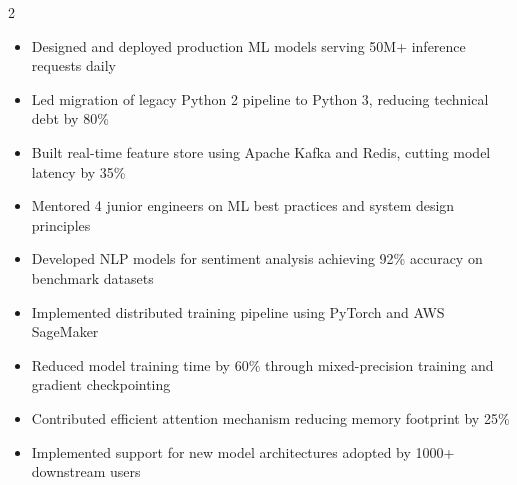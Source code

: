 \documentclass[10pt,a4paper,ragged2e,withhyper]{altacv}
\begin{document}

\makecvheader


\begin{paracol}{2}


\begin{itemize}
  \item Designed and deployed production ML models serving 50M+ inference requests daily
  \item Led migration of legacy Python 2 pipeline to Python 3, reducing technical debt by 80\%
  \item Built real-time feature store using Apache Kafka and Redis, cutting model latency by 35\%
  \item Mentored 4 junior engineers on ML best practices and system design principles
\end{itemize}

\divider

\begin{itemize}
  \item Developed NLP models for sentiment analysis achieving 92\% accuracy on benchmark datasets
  \item Implemented distributed training pipeline using PyTorch and AWS SageMaker
  \item Reduced model training time by 60\% through mixed-precision training and gradient checkpointing
\end{itemize}


\begin{itemize}
  \item Contributed efficient attention mechanism reducing memory footprint by 25\%
  \item Implemented support for new model architectures adopted by 1000+ downstream users
\end{itemize}

\switchcolumn



\end{paracol}
\end{document}
